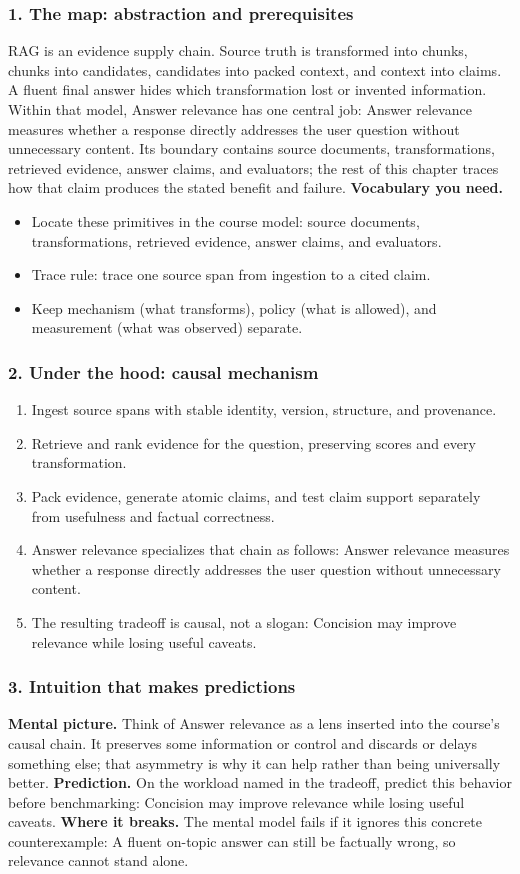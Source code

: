 \subsubsection*{1. The map: abstraction and prerequisites}
RAG is an evidence supply chain. Source truth is transformed into chunks, chunks into candidates, candidates into packed context, and context into claims. A fluent final answer hides which transformation lost or invented information.
Within that model, Answer relevance has one central job: Answer relevance measures whether a response directly addresses the user question without unnecessary content. Its boundary contains source documents, transformations, retrieved evidence, answer claims, and evaluators; the rest of this chapter traces how that claim produces the stated benefit and failure.
\textbf{Vocabulary you need.}\begin{itemize}
\item Locate these primitives in the course model: source documents, transformations, retrieved evidence, answer claims, and evaluators.
\item Trace rule: trace one source span from ingestion to a cited claim.
\item Keep mechanism (what transforms), policy (what is allowed), and measurement (what was observed) separate.
\end{itemize}
\subsubsection*{2. Under the hood: causal mechanism}\begin{enumerate}
\item Ingest source spans with stable identity, version, structure, and provenance.
\item Retrieve and rank evidence for the question, preserving scores and every transformation.
\item Pack evidence, generate atomic claims, and test claim support separately from usefulness and factual correctness.
\item Answer relevance specializes that chain as follows: Answer relevance measures whether a response directly addresses the user question without unnecessary content.
\item The resulting tradeoff is causal, not a slogan: Concision may improve relevance while losing useful caveats.
\end{enumerate}
\subsubsection*{3. Intuition that makes predictions}
\textbf{Mental picture.} Think of Answer relevance as a lens inserted into the course's causal chain. It preserves some information or control and discards or delays something else; that asymmetry is why it can help rather than being universally better.
\textbf{Prediction.} On the workload named in the tradeoff, predict this behavior before benchmarking: Concision may improve relevance while losing useful caveats.
\textbf{Where it breaks.} The mental model fails if it ignores this concrete counterexample: A fluent on-topic answer can still be factually wrong, so relevance cannot stand alone.
